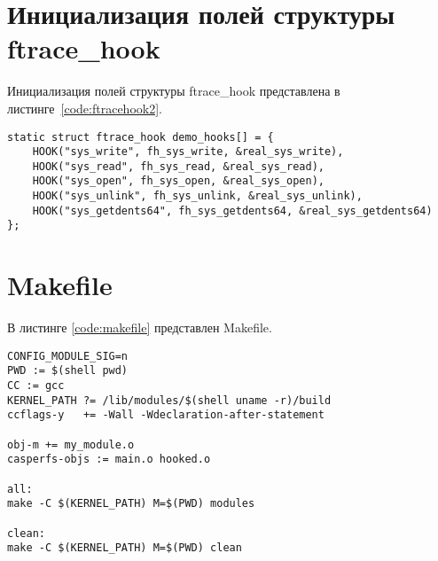 \section{Инициализация полей структуры ftrace\_hook}

Инициализация полей структуры ftrace\_hook представлена в листинге~\ref{code:ftracehook2}.

\begin{lstlisting}[label=code:ftracehook2,caption=Инициализация полей структуры ftrace\_hook]
static struct ftrace_hook demo_hooks[] = {
	HOOK("sys_write", fh_sys_write, &real_sys_write),
	HOOK("sys_read", fh_sys_read, &real_sys_read),
	HOOK("sys_open", fh_sys_open, &real_sys_open),
	HOOK("sys_unlink", fh_sys_unlink, &real_sys_unlink),
	HOOK("sys_getdents64", fh_sys_getdents64, &real_sys_getdents64)
};
\end{lstlisting}

\section{Makefile}

В листинге \ref{code:makefile} представлен Makefile.

\begin{lstlisting}[label=code:makefile,caption=Makefile]
CONFIG_MODULE_SIG=n
PWD := $(shell pwd)
CC := gcc
KERNEL_PATH ?= /lib/modules/$(shell uname -r)/build
ccflags-y	+= -Wall -Wdeclaration-after-statement

obj-m += my_module.o
casperfs-objs := main.o hooked.o 

all:
make -C $(KERNEL_PATH) M=$(PWD) modules

clean:
make -C $(KERNEL_PATH) M=$(PWD) clean
\end{lstlisting}
